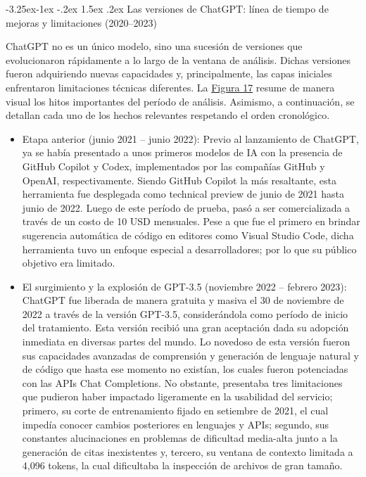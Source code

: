 \documentclass[12pt,a4paper]{article}
\makeatletter
\let\textbf\textmd
\renewcommand\subsection{\@startsection{subsection}{2}{\z@}%
  {-3.25ex\@plus -1ex \@minus -.2ex}%
  {1.5ex \@plus .2ex}%
  {\normalfont\normalsize}}
\makeatother
\begin{document}
\subsection{Las versiones de ChatGPT: línea de tiempo de mejoras y limitaciones (2020--2023)}

ChatGPT no es un único modelo, sino una sucesión de versiones que evolucionaron rápidamente a lo largo de la ventana de análisis. Dichas versiones fueron adquiriendo nuevas capacidades y, principalmente, las capas iniciales enfrentaron limitaciones técnicas diferentes. La \hyperref[fig:timeline_chatgpt]{Figura 17} resume de manera visual los hitos importantes del período de análisis. Asimismo, a continuación, se detallan cada uno de los hechos relevantes respetando el orden cronológico.

\begin{itemize}
\item \textbf{Etapa anterior (junio 2021 – junio 2022):} Previo al lanzamiento de ChatGPT, ya se había presentado a unos primeros modelos de IA con la presencia de GitHub Copilot y Codex, implementados por las compañías GitHub y OpenAI, respectivamente. Siendo GitHub Copilot la más resaltante, esta herramienta fue desplegada como technical preview de junio de 2021 hasta junio de 2022. Luego de este período de prueba, pasó a ser comercializada a través de un costo de 10 USD mensuales. Pese a que fue el primero en brindar sugerencia automática de código en editores como Visual Studio Code, dicha herramienta tuvo un enfoque especial a desarrolladores; por lo que su público objetivo era limitado.

\item \textbf{El surgimiento y la explosión de GPT-3.5 (noviembre 2022 – febrero 2023):} ChatGPT fue liberada de manera gratuita y masiva el 30 de noviembre de 2022 a través de la versión GPT-3.5, considerándola como período de inicio del tratamiento. Esta versión recibió una gran aceptación dada su adopción inmediata en diversas partes del mundo. Lo novedoso de esta versión fueron sus capacidades avanzadas de comprensión y generación de lenguaje natural y de código que hasta ese momento no existían, los cuales fueron potenciadas con las APIs Chat Completions. No obstante, presentaba tres limitaciones que pudieron haber impactado ligeramente en la usabilidad del servicio; primero, su corte de entrenamiento fijado en setiembre de 2021, el cual impedía conocer cambios posteriores en lenguajes y APIs; segundo, sus constantes alucinaciones en problemas de dificultad media-alta junto a la generación de citas inexistentes y, tercero, su ventana de contexto limitada a 4,096 tokens, la cual dificultaba la inspección de archivos de gran tamaño.


\end{itemize}
\end{document}
